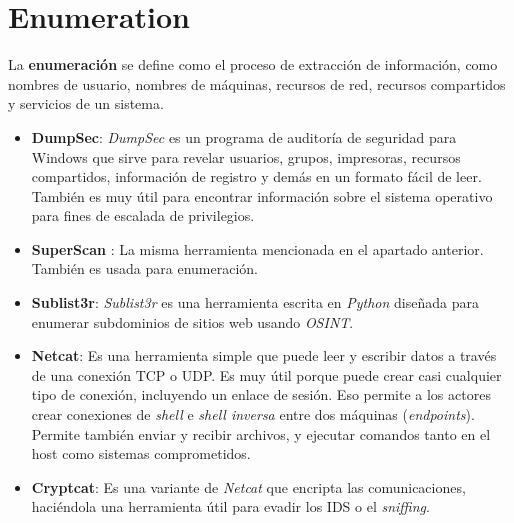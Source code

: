 \documentclass[bibliography=totocnumbered]{scrartcl}
\begin{document}
\newpage
\section{Enumeration}
La \textbf{enumeración} se define como el proceso de extracción de información, como nombres de usuario, nombres de máquinas, recursos de red, recursos compartidos y servicios de un sistema.
\begin{itemize}
\item \textbf{DumpSec}\parencite{dumpsec}: \textit{DumpSec} es un programa de auditoría de seguridad para Windows que sirve para revelar usuarios, grupos, impresoras, recursos compartidos, información de registro y demás en un formato fácil de leer. También es muy útil para encontrar información sobre el sistema operativo  para fines de escalada de privilegios.
\item \textbf{SuperScan} \parencite{superscan}: La misma herramienta mencionada en el apartado anterior. También es usada para enumeración.
\item \textbf{Sublist3r}\parencite{sublist3r}: \textit{Sublist3r} es una herramienta escrita en \textit{Python} diseñada para enumerar subdominios de sitios web usando \textit{OSINT}\parencite{osint}.
\item \textbf{Netcat}\parencite{netcat}: Es una herramienta simple que puede leer y escribir datos a través de una conexión TCP o UDP. Es muy útil porque puede crear casi cualquier tipo de conexión, incluyendo un enlace de sesión. Eso permite a los actores crear conexiones de \textit{shell} e \textit{shell inversa} entre dos máquinas (\textit{endpoints}). Permite también enviar y recibir archivos, y ejecutar comandos tanto en el host como sistemas comprometidos.
\item \textbf{Cryptcat}\parencite{cryptcat}: Es una variante de \textit{Netcat}\parencite{netcat} que encripta las comunicaciones, haciéndola una herramienta útil para evadir los IDS o el \textit{sniffing}.
\end{itemize}

\newpage
\nocite{*}
\printbibliography 
\end{document}
